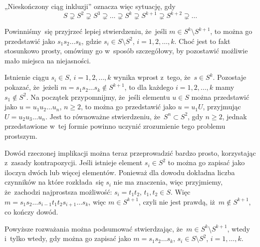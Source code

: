 \documentclass[a4paper,11pt]{article}
\begin{document}
„Nieskończony ciąg inkluzji” oznacza więc sytuację, gdy
\begin{equation}
  \label{eq:Forys-Forys-52}
  S \supsetneq S^{ 2 } \supsetneq S^{ 3 } \supsetneq \ldots \supsetneq S^{ k } \supsetneq S^{ k + 1 } \supsetneq S^{ k + 2 } \supsetneq \ldots
\end{equation}

\vspace{\spaceFour}





 Powinniśmy~się przyjrzeć lepiej stwierdzeniu, że~jeśli
$m \in S^{ k } \setminus S^{ k + 1 }$, to można go przedstawić jako
$s_{ 1 } s_{ 2 } \ldots s_{ k }$, gdzie
$s_{ i } \in S \setminus S^{ 2 }$, $i = 1, 2, \ldots, k$. Choć jest to fakt
stosunkowo prosty, omówimy go w~sposób szczegółowy, by pozostawić
możliwie mało miejsca na niejasności.

Istnienie ciągu $s_{ i } \in S$, $i = 1, 2, \ldots, k$ wynika wprost z~tego,
że~$s \in S^{ k }$. Pozostaje pokazać, że~jeżeli
$m = s_{ 1 } s_{ 2 } \ldots s_{ k } \notin S^{ k + 1 }$, to dla każdego
$i = 1, 2, \ldots, k$ mamy $s_{ 1 } \notin S^{ 2 }$. Na początek
przypomnijmy, że~jeśli elementu $u \in S$ można przedstawić jako
$u = u_{ 1 } u_{ 2 } \ldots u_{ n }$, $n \geq 2$, to można go przedstawić
jako $u = u_{ 1 } U$, przyjmując $U = u_{ 2 } u_{ 3 } \ldots u_{ n }$. Jest
to równoważne stwierdzeniu, że~$S^{ n } \subset S^{ 2 }$, gdy
$n \geq 2$, jednak przedstawione w~tej formie powinno uczynić
zrozumienie tego problemu prostszym.

Dowód rzeczonej implikacji można teraz przeprowadzić bardzo prosto,
korzystając z~zasady kontrapozycji. Jeśli istnieje element
$s_{ i } \in S^{ 2 }$ to można go zapisać jako iloczyn dwóch lub
więcej elementów. Ponieważ dla dowodu dokładna liczba czynników na
które rozkłada~się $s_{ i }$ nie ma znaczenia, więc przyjmiemy,
że~zachodzi najprostsza możliwość: $s_{ i } = t_{ 1 } t_{ 2 }$,
$t_{ 1 }, t_{ 2 } \in S$. Więc
$m = s_{ 1 } s_{ 2 } \ldots s_{ i - 1 } t_{ 1 } t_{ 2 } s_{ i + 1 } \ldots s_{ k
}$, więc $m \in S^{ k + 1 }$, czyli nie jest prawdą,
iż~$m \notin S^{ k + 1 }$, co kończy dowód.

Powyższe rozważania można podsumować stwierdzając,
że~$m \in S^{ k } \setminus S^{ k + 1 }$, wtedy i~tylko wtedy, gdy
można go zapisać jako $m = s_{ 1 } s_{ 2 } \ldots s_{ k }$,
$s_{ i } \in S \setminus S^{ 2 }$, $i = 1, \ldots, k$.

\vspace{\spaceFour}
\end{document}
